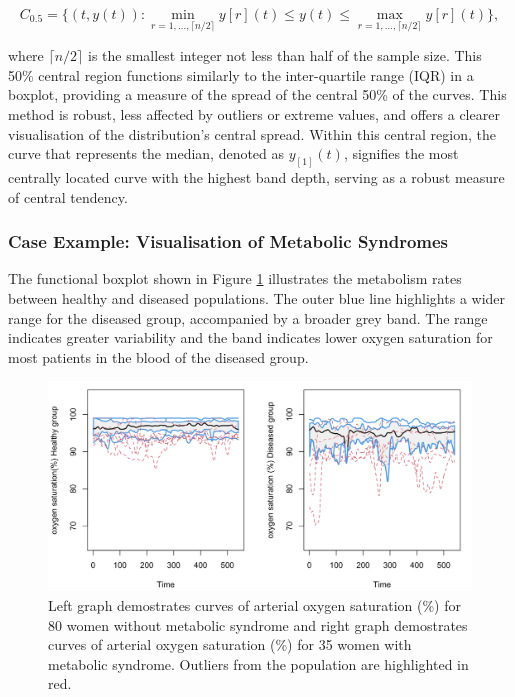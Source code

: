 \documentclass{article}\usepackage[]{graphicx}\usepackage[]{xcolor}
\numberwithin{equation}{section}
\begin{document}
\begin{equation}
C_{0.5} = \{(t, y(t)) : \min_{r=1, \ldots, \lceil n/2 \rceil} y[r](t) \leq y(t) \leq \max_{r=1, \ldots, \lceil n/2 \rceil} y[r](t)\},
\end{equation}

\noindent
where $\lceil n/2 \rceil$ is the smallest integer not less than half of the sample size. This 50\% central region functions similarly to the inter-quartile range (IQR) in a boxplot, providing a measure of the spread of the central 50\% of the curves. This method is robust, less affected by outliers or extreme values, and offers a clearer visualisation of the distribution's central spread. Within this central region, the curve that represents the median, denoted as $y_{[1]}(t)$, signifies the most centrally located curve with the highest band depth, serving as a robust measure of central tendency.

\subsubsection{Case Example: Visualisation of Metabolic Syndromes}
\noindent
The functional boxplot shown in Figure \ref{fig:fbplot} illustrates the metabolism rates between healthy and diseased populations. The outer blue line highlights a wider range for the diseased group, accompanied by a broader grey band. The range indicates greater variability and the band indicates lower oxygen saturation for most patients in the blood of the diseased group.
\begin{figure}[H]
    \centering
    \includegraphics[width=1\textwidth]{image_reference/fbplot.png}
    \caption{Left graph demostrates curves of arterial oxygen saturation (\%) for 80 women without metabolic syndrome and right graph demostrates curves of arterial oxygen saturation (\%) for 35 women with metabolic syndrome. Outliers from the population are highlighted in red.}
    \label{fig:fbplot}
\end{figure}
\end{document}
